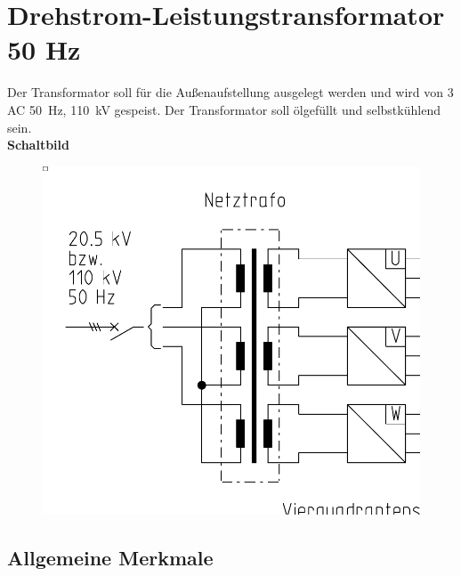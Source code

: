 \section{Drehstrom-Leistungstransformator 50 Hz}
Der Transformator soll für die Außenaufstellung ausgelegt werden und wird von 3 AC \SI[]{50}[]{\Hz}, \SI[]{110}[]{\kilo\volt} gespeist.
Der Transformator soll ölgefüllt und selbstkühlend sein.\\ 

\textbf{Schaltbild}
\begin{figure}[htb]
\centering
\includegraphics[width=\textwidth/2,frame]{Bilder/netztrafo.png}
\end{figure}

\subsection{Allgemeine Merkmale}

